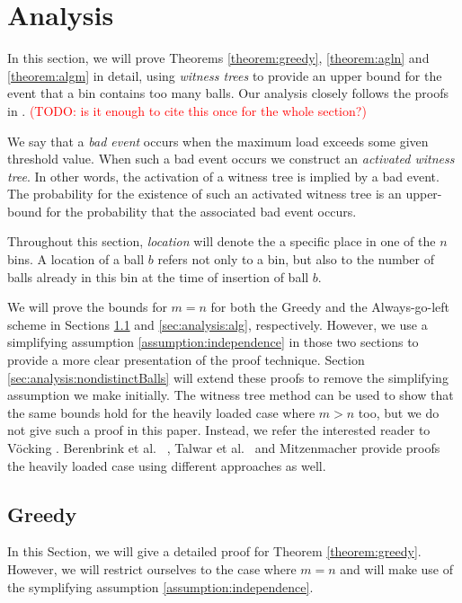 \documentclass[a4paper,12pt]{article}
\newcommand\todo[1]{\textcolor{red}{(TODO: #1)}}
\begin{document}
\section{Analysis}
\label{sec:analysis}
In this section, we will prove Theorems \ref{theorem:greedy}, \ref{theorem:agln} and \ref{theorem:algm} in detail, using \emph{witness trees} to provide an upper bound for the event that a bin contains too many balls. Our analysis closely follows the proofs in \cite{VOC03}. \todo{is it enough to cite this once for the whole section?}

We say that a \emph{bad event} occurs when the maximum load exceeds some given threshold value. When such a bad event occurs we construct an \emph{activated witness tree}. In other words, the activation of a witness tree is implied by a bad event. The probability for the existence of such an activated witness tree is an upper-bound for the probability that the associated bad event occurs.

Throughout this section, \emph{location} will denote the a specific place in one of the $n$ bins. A location of a ball $b$ refers not only to a bin, but also to the number of balls already in this bin at the time of insertion of ball $b$.

We will prove the bounds for $m=n$ for both the Greedy and the Always-go-left scheme in Sections \ref{sec:analysis:greedy} and \ref{sec:analysis:alg}, respectively. However, we use a simplifying assumption \ref{assumption:independence} in those two sections to provide a more clear presentation of the proof technique. Section \ref{sec:analysis:nondistinctBalls} will extend these proofs to remove the simplifying assumption we make initially. The witness tree method can be used to show that the same bounds hold for the heavily loaded case where $m> n$ too, but we do not give such a proof in this paper. Instead, we refer the interested reader to V\"ocking \cite{VOC03}. Berenbrink et al.  ~\cite{BCSV06}, Talwar et al.~\cite{TW13} and Mitzenmacher \cite{MRS01} provide proofs the heavily loaded case using different approaches as well.

\subsection{Greedy}
\label{sec:analysis:greedy}
In this Section, we will give a detailed proof for Theorem \ref{theorem:greedy}. However, we will restrict ourselves to the case where $m = n$ and will make use of the symplifying assumption \ref{assumption:independence}.
\end{document}
